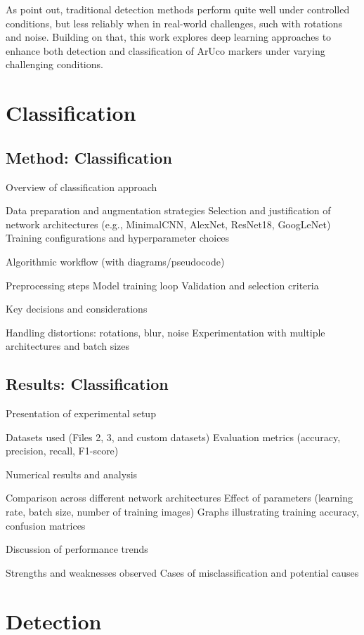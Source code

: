 \documentclass[conference]{IEEEtran}
\begin{document}
As \textcite{FiducialMarkerNoisy} point out, traditional detection methods perform quite well under controlled conditions, but less reliably when in real-world challenges,
such with rotations and noise. Building on that, this work explores deep learning approaches to enhance both detection and classification of ArUco markers under varying
challenging conditions. 

\section{Classification}

\subsection{Method: Classification}

Overview of classification approach

Data preparation and augmentation strategies
Selection and justification of network architectures (e.g., MinimalCNN, AlexNet, ResNet18, GoogLeNet)
Training configurations and hyperparameter choices

Algorithmic workflow (with diagrams/pseudocode)

Preprocessing steps
Model training loop
Validation and selection criteria

Key decisions and considerations

Handling distortions: rotations, blur, noise
Experimentation with multiple architectures and batch sizes

\subsection{Results: Classification}

Presentation of experimental setup

Datasets used (Files 2, 3, and custom datasets)
Evaluation metrics (accuracy, precision, recall, F1-score)

Numerical results and analysis

Comparison across different network architectures
Effect of parameters (learning rate, batch size, number of training images)
Graphs illustrating training accuracy, confusion matrices

Discussion of performance trends

Strengths and weaknesses observed
Cases of misclassification and potential causes

\section{Detection}
\end{document}
